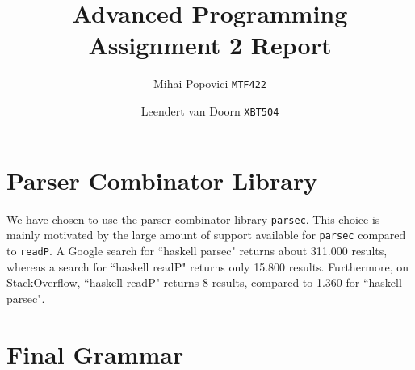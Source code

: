 \documentclass{article}
\title{Advanced Programming Assignment 2 Report}
\author{Mihai Popovici \texttt{MTF422} \and Leendert van Doorn \texttt{XBT504}}
\begin{document}
\maketitle

\section{Parser Combinator Library}
We have chosen to use the parser combinator library \texttt{parsec}. This choice is mainly motivated by the large amount of support available for \texttt{parsec} compared to \texttt{readP}. A Google search for ``haskell parsec" returns about 311.000 results, whereas a search for ``haskell readP" returns only 15.800 results. Furthermore, on StackOverflow, ``haskell readP" returns 8 results, compared to 1.360 for ``haskell parsec".

\section{Final Grammar}

\setlength{\grammarparsep}{4pt plus 1pt minus 1pt} %
\setlength{\grammarindent}{9em} %
\end{document}
